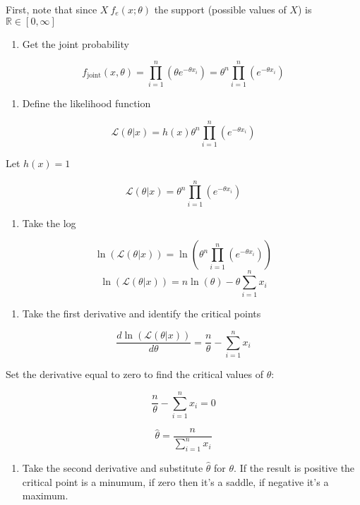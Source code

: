 \documentclass[
]{article}
\providecommand{\tightlist}{%
  \setlength{\itemsep}{0pt}\setlength{\parskip}{0pt}}
\begin{document}
First, note that since \(X~f_e(x;\theta)\) the support (possible values
of \(X\)) is \(\mathbb{R}\in [0, \infty]\)

\begin{enumerate}
\def\labelenumi{\arabic{enumi}.}
\tightlist
\item
  Get the joint probability
\end{enumerate}

\[f_{\mathrm{joint}}(x,\theta)=\prod_{i=1}^n(\theta e^{-\theta x_i})=\theta^n\prod_{i=1}^n( e^{-\theta x_i})\]

\begin{enumerate}
\def\labelenumi{\arabic{enumi}.}
\setcounter{enumi}{1}
\tightlist
\item
  Define the likelihood function
\end{enumerate}

\[\mathcal{L}(\theta|x)=h(x)\theta^n\prod_{i=1}^n( e^{-\theta x_i})\]

Let \(h(x)=1\)

\[\mathcal{L}(\theta|x)=\theta^n\prod_{i=1}^n( e^{-\theta x_i})\]

\begin{enumerate}
\def\labelenumi{\arabic{enumi}.}
\setcounter{enumi}{2}
\tightlist
\item
  Take the log
\end{enumerate}

\[\ln(\mathcal{L}(\theta|x))=\ln(\theta^n\prod_{i=1}^n( e^{-\theta x_i}))\]
\[\ln(\mathcal{L}(\theta|x))=n\ln(\theta)-\theta\sum_{i=1}^nx_i\]

\begin{enumerate}
\def\labelenumi{\arabic{enumi}.}
\setcounter{enumi}{3}
\tightlist
\item
  Take the first derivative and identify the critical points
\end{enumerate}

\[\frac{d\ln(\mathcal{L}(\theta|x))}{d\theta}=\frac{n}{\theta}-\sum_{i=1}^nx_i\]

Set the derivative equal to zero to find the critical values of
\(\theta\):

\[\frac{n}{\theta}-\sum_{i=1}^nx_i=0\]

\[\hat{\theta}=\frac{n}{\sum_{i=1}^nx_i}\]

\begin{enumerate}
\def\labelenumi{\arabic{enumi}.}
\setcounter{enumi}{4}
\tightlist
\item
  Take the second derivative and substitute \(\hat{\theta}\) for
  \(\theta\). If the result is positive the critical point is a minumum,
  if zero then it's a saddle, if negative it's a maximum.
\end{enumerate}
\end{document}

